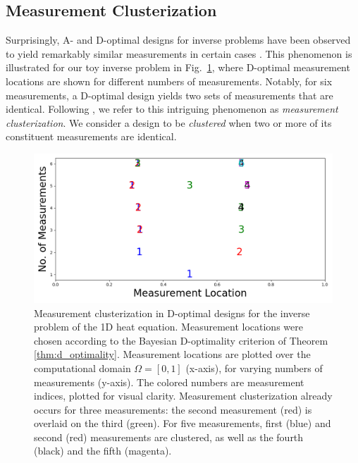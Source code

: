 \documentclass[ba]{imsart}
\theoremstyle{plain}
\theoremstyle{definition}
\theoremstyle{remark}
\begin{document}
\subsection{Measurement Clusterization}
Surprisingly, A- and D-optimal designs for inverse problems have been
observed to yield remarkably similar measurements in certain cases
\cite{fedorov1996, nyberg2012, fedorov1997, Ucinski05,
  neitzel2019sparse}. This phenomenon is illustrated for our toy
inverse problem in Fig.~\ref{fig:clusterization_illustration}, where
D-optimal measurement locations are shown for different numbers of
measurements. Notably, for six measurements, a D-optimal design yields
two sets of measurements that are identical. Following
\cite{Ucinski05}, we refer to this intriguing phenomenon as
\emph{measurement clusterization}. We consider a design to be
\emph{clustered} when two or more of its constituent measurements are
identical.

\begin{figure}
    \centering
    \includegraphics[height=0.5\textwidth]{figs/dst_modelError0.png}
    \caption{Measurement clusterization in D-optimal designs for the
      inverse problem of the 1D heat equation. Measurement locations
      were chosen according to the Bayesian D-optimality criterion of
      Theorem \ref{thm:d_optimality}. Measurement locations are
      plotted over the computational domain \(\Omega = [0, 1]\)
      (x-axis), for varying numbers of measurements (y-axis). The
      colored numbers are measurement indices, plotted for visual
      clarity. Measurement clusterization already occurs for three
      measurements: the second measurement (red) is overlaid on the
      third (green). For five measurements, first (blue) and second
      (red) measurements are clustered, as well as the fourth (black)
      and the fifth (magenta).}
  \label{fig:clusterization_illustration}
\end{figure}
\end{document}
